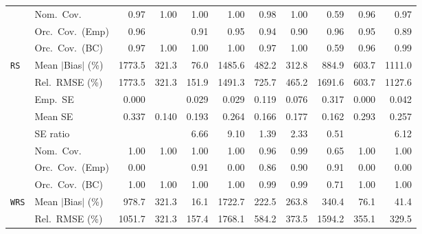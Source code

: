 \begin{landscape}
\begin{longtable}{llrrrrrrrrr}
 & Nom.\ Cov. & \cellcolor{ranktwo}0.97 & 1.00 & 1.00 & 1.00 & \cellcolor{rankthree}0.98 & 1.00 & 0.59 & \cellcolor{rankone}0.96 & \cellcolor{ranktwo}0.97 \\
 & Orc.\ Cov.\ (Emp) & \cellcolor{ranktwo}0.96 &  & \cellcolor{rankthree}0.91 & \cellcolor{rankone}0.95 & \cellcolor{ranktwo}0.94 & 0.90 & \cellcolor{ranktwo}0.96 & \cellcolor{rankone}0.95 & 0.89 \\
 & Orc.\ Cov.\ (BC) & \cellcolor{ranktwo}0.97 & 1.00 & 1.00 & 1.00 & \cellcolor{ranktwo}0.97 & 1.00 & 0.59 & \cellcolor{rankone}0.96 & \cellcolor{rankthree}0.99 \\
\addlinespace[2pt]
\quad \texttt{RS} & Mean $|$Bias$|$ (\%) & 1773.5 & \cellcolor{rankthree}321.3 & \cellcolor{rankone}76.0 & 1485.6 & 482.2 & \cellcolor{ranktwo}312.8 & 884.9 & 603.7 & 1111.0 \\
 & Rel.\ RMSE (\%) & 1773.5 & \cellcolor{ranktwo}321.3 & \cellcolor{rankone}151.9 & 1491.3 & 725.7 & \cellcolor{rankthree}465.2 & 1691.6 & 603.7 & 1127.6 \\
 & Emp.\ SE & 0.000 &  & 0.029 & 0.029 & 0.119 & 0.076 & 0.317 & 0.000 & 0.042 \\
 & Mean SE & 0.337 & 0.140 & 0.193 & 0.264 & 0.166 & 0.177 & 0.162 & 0.293 & 0.257 \\
 & SE ratio &  &  & 6.66 & 9.10 & \cellcolor{rankone}1.39 & \cellcolor{rankthree}2.33 & \cellcolor{ranktwo}0.51 &  & 6.12 \\
 & Nom.\ Cov. & \cellcolor{rankthree}1.00 & \cellcolor{rankthree}1.00 & \cellcolor{rankthree}1.00 & \cellcolor{rankthree}1.00 & \cellcolor{rankone}0.96 & \cellcolor{ranktwo}0.99 & 0.65 & \cellcolor{rankthree}1.00 & \cellcolor{rankthree}1.00 \\
 & Orc.\ Cov.\ (Emp) & 0.00 &  & \cellcolor{rankone}0.91 & 0.00 & \cellcolor{rankthree}0.86 & \cellcolor{ranktwo}0.90 & \cellcolor{rankone}0.91 & 0.00 & 0.00 \\
 & Orc.\ Cov.\ (BC) & \cellcolor{ranktwo}1.00 & \cellcolor{ranktwo}1.00 & \cellcolor{ranktwo}1.00 & \cellcolor{ranktwo}1.00 & \cellcolor{rankone}0.99 & \cellcolor{rankone}0.99 & \cellcolor{rankthree}0.71 & \cellcolor{ranktwo}1.00 & \cellcolor{ranktwo}1.00 \\
\addlinespace[2pt]
\quad \texttt{WRS} & Mean $|$Bias$|$ (\%) & 978.7 & 321.3 & \cellcolor{rankone}16.1 & 1722.7 & 222.5 & 263.8 & 340.4 & \cellcolor{rankthree}76.1 & \cellcolor{ranktwo}41.4 \\
 & Rel.\ RMSE (\%) & 1051.7 & \cellcolor{ranktwo}321.3 & \cellcolor{rankone}157.4 & 1768.1 & 584.2 & 373.5 & 1594.2 & 355.1 & \cellcolor{rankthree}329.5 \\

\end{longtable}
\end{landscape}
